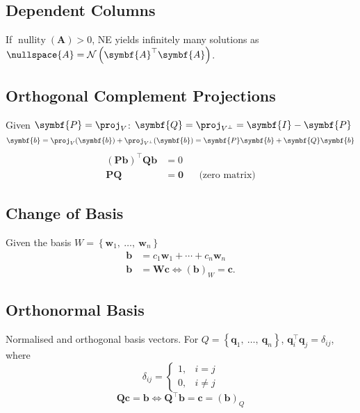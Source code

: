 \documentclass{article}
\DeclareMathOperator*{\nullity}{nullity}
\begin{document}
\begin{multicols*}{3}
    \subsection{Dependent Columns}
    If \(\nullity{\left( \symbf{A} \right)} > 0\), NE yields infinitely
    many solutions as \(\nullspace{A} = \mathcal{N}\left(\symbf{A}^\top
    \symbf{A}\right)\).
    \subsection{Orthogonal Complement Projections}
    Given \(\symbf{P} = \proj_V\): \(\symbf{Q} = \proj_{V^\perp} =
    \symbf{I} - \symbf{P}\)
    \begin{equation*}
        \symbf{b} = \proj_V(\symbf{b}) + \proj_{V^\perp}(\symbf{b}) = \symbf{P}\symbf{b} + \symbf{Q}\symbf{b}
    \end{equation*}
    \begin{align*}
        \left( \symbf{P}\symbf{b} \right)^\top \symbf{Q}\symbf{b} & = 0                                   \\
        \symbf{P} \symbf{Q}                                       & = \symbf{0} &  & \text{(zero matrix)}
    \end{align*}
    \subsection{Change of Basis}
    Given the basis \(W = \left\{ \symbf{w}_1,\: \dots,\: \symbf{w}_n
    \right\}\)
    \begin{align*}
        \symbf{b} & = c_1 \symbf{w}_1 + \cdots + c_n \symbf{w}_n                       \\
        \symbf{b} & = \symbf{W} \symbf{c} \iff \left( \symbf{b} \right)_W = \symbf{c}.
    \end{align*}
    \subsection{Orthonormal Basis}
    Normalised and orthogonal basis vectors. For \(Q = \left\{
    \symbf{q}_1,\: \dots,\: \symbf{q}_n \right\}\), \(\symbf{q}_i^\top
    \symbf{q}_j = \delta_{ij}\), where
    \begin{equation*}
        \delta_{ij} =
        \begin{cases}
            1, & i = j   \\
            0, & i \ne j
        \end{cases}
    \end{equation*}
    \begin{equation*}
        \symbf{Q} \symbf{c} = \symbf{b}
        \iff
        \symbf{Q}^\top \symbf{b} = \symbf{c} = \left( \symbf{b} \right)_Q
    \end{equation*}

\end{multicols*}
\end{document}
